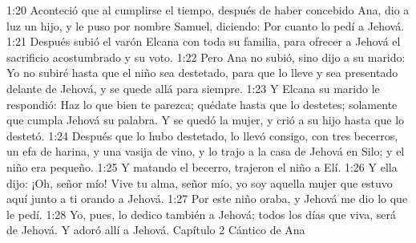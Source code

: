 1:20 Aconteció que al cumplirse el tiempo, después de haber concebido Ana, dio a luz un hijo, y le puso por nombre Samuel, diciendo: Por cuanto lo pedí a Jehová.  
1:21 Después subió el varón Elcana con toda su familia, para ofrecer a Jehová el sacrificio acostumbrado y su voto.  
1:22 Pero Ana no subió, sino dijo a su marido: Yo no subiré hasta que el niño sea destetado, para que lo lleve y sea presentado delante de Jehová, y se quede allá para siempre.  
1:23 Y Elcana su marido le respondió: Haz lo que bien te parezca; quédate hasta que lo destetes; solamente que cumpla Jehová su palabra. Y se quedó la mujer, y crió a su hijo hasta que lo destetó.  
1:24 Después que lo hubo destetado, lo llevó consigo, con tres becerros, un efa   de harina, y una vasija de vino, y lo trajo a la casa de Jehová en Silo; y el niño era pequeño.  
1:25 Y matando el becerro, trajeron el niño a Elí.  
1:26 Y ella dijo: ¡Oh, señor mío! Vive tu alma, señor mío, yo soy aquella mujer que estuvo aquí junto a ti orando a Jehová.  
1:27 Por este niño oraba, y Jehová me dio lo que le pedí.  
1:28 Yo, pues, lo dedico también a Jehová; todos los días que viva, será de Jehová. Y adoró allí a Jehová.  
Capítulo 2
Cántico de Ana  

